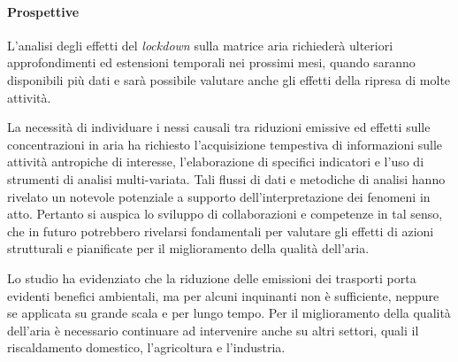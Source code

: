 \paragraph{Prospettive}
L'analisi degli effetti del \textit{lockdown} sulla matrice aria richiederà ulteriori approfondimenti ed estensioni temporali nei prossimi mesi, quando saranno disponibili più dati e sarà possibile valutare anche gli effetti della ripresa di molte attività.

La necessità di individuare i nessi causali tra riduzioni emissive ed effetti sulle concentrazioni in aria ha richiesto l'acquisizione tempestiva di informazioni sulle attività antropiche di interesse, l'elaborazione di specifici indicatori e l'uso di strumenti di analisi multi-variata. Tali flussi di dati e metodiche di analisi hanno rivelato un notevole potenziale a supporto dell'interpretazione dei fenomeni in atto. Pertanto si auspica lo sviluppo di collaborazioni e competenze in tal senso, che in futuro potrebbero rivelarsi fondamentali per valutare gli effetti di azioni strutturali e pianificate per il miglioramento della qualità dell'aria.

Lo studio ha evidenziato che la riduzione delle emissioni dei trasporti porta evidenti benefici ambientali, ma per alcuni inquinanti non è sufficiente, neppure se applicata su grande scala e per lungo tempo. Per il miglioramento della qualità dell'aria è necessario continuare ad intervenire anche su altri settori, quali il riscaldamento domestico, l'agricoltura e l'industria.  

